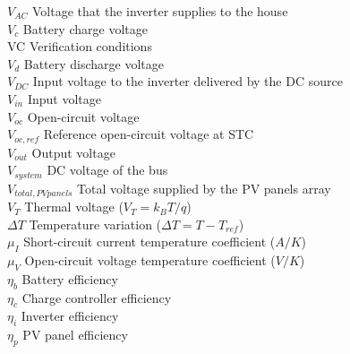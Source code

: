 $ V_{AC}  $ Voltage that the inverter supplies to the house \\
$V_{c}$ Battery charge voltage  \\
VC Verification conditions \\
$V_{d}$ Battery discharge voltage \\
$ V_{DC} $ Input voltage to the inverter delivered by the DC source \\
$ V_{in} $ Input voltage \\
$ V_{oc} $ Open-circuit voltage \\
$ V_{oc,ref} $ Reference open-circuit voltage at STC \\
$ V_{out} $ Output voltage \\
$ V_{system} $ DC voltage of the bus \\
$V_{total,PVpanels}$ Total voltage supplied by the PV panels array \\
$V_{T}$ Thermal voltage ($ V_{T}=k_{B}T/q $) \\
$\Delta T$ Temperature variation ($\Delta T=T-T_{ref} $) \\
$ \mu_{I} $ Short-circuit current temperature coefficient ($A/K$) \\
$ \mu_{V} $ Open-circuit voltage temperature coefficient ($ V/K $) \\
$\eta_{b}$ Battery efficiency \\
$\eta_{c}$ Charge controller efficiency \\
$\eta_{i}$ Inverter efficiency \\
$\eta_{p}$ PV panel efficiency \\